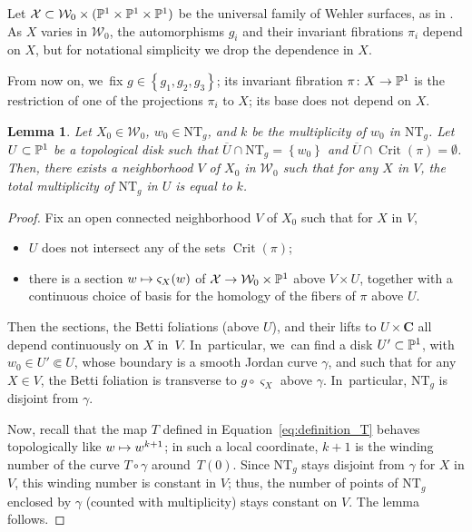 \documentclass[11pt]{article}
\newcommand\mto{\mathchoice{\longmapsto}{\mapsto}{\mapsto}{\mapsto}}
\newcommand{\set}[1]{\left\{#1\right\}}
\DeclareMathOperator{\Crit}{Crit}
\def\C{\mathbf{C}}
\newcommand{\cX}{\mathcal{X}}
\newcommand{\cW}{\mathcal{W}}
\newcommand{\NT}{{\mathrm{NT}}}
\theoremstyle{plain}
\newtheorem{lem}[thm]{Lemma}
\theoremstyle{definition}
\numberwithin{equation}{section}
\begin{document}
Let $\cX\subset \cW_0\times (\P^1\times \P^1\times \P^1)$ be
the universal family of Wehler surfaces, as in \cite[\S 2]{finite_orbits}.
As $X$ varies in $ \cW_0$, the automorphisms $g_i$ and their
invariant fibrations $\pi_i$ depend on $X$, but for notational simplicity we drop the dependence in $X$.

From now on, we~fix $g\in \set{g_1, g_2, g_3}$; its invariant fibration $\pi\colon X\to \P^1$ is the restriction of one of the projections $\pi_i$ to $X$; its base does not depend on $X$.

\begin{lem}\label{lem:NT_local}
Let $X_0\in \cW_0$, $w_0\in \NT_g$, and $k$ be the multiplicity of $w_0$ in $\NT_g$.
Let $U\subset \P^1$ be a topological disk such that $\overline U\cap \NT_g = \set{w_0}$ and $\overline U\cap \Crit(\pi)=\emptyset$.
Then, there exists a neighborhood $V$
of $X_0$ in $\cW_0$ such that for any $X$ in $V$, the total multiplicity of
$\NT_g$ in $U$ is equal to $k$.
\end{lem}

\begin{proof}
Fix an open connected neighborhood $V$ of $X_0$ such that for $X$ in $V$,
\begin{itemize}
\item $U$ does not intersect any of the sets $\Crit(\pi)$;
\item there is a section $w\mto \varsigma_X(w)$
of $\cX\to \cW_0\times \P^1$ above $V\times U$, together with a continuous choice of basis for the homology of the fibers of $\pi$ above $U$.
\end{itemize}
Then the sections, the Betti foliations (above $U$), and their lifts to $U\times \C$ all
depend continuously on $X$ in~$V$. In~particular, we~can find a disk $U'\subset \P^1$, with
$w_0\in U'\Subset U$, whose boundary is a
smooth Jordan curve $\gamma$, and such that
for any $X\in V$, the Betti foliation is transverse to $g\circ \varsigma_X$ above $\gamma$. In~particular,
$\NT_g$ is disjoint from $\gamma$.

Now, recall that the map $T$ defined in Equation~\eqref{eq:definition_T}
behaves topologically like $w\mto w^{k+1}$; in such a local coordinate,
$k+1$ is the winding number of the curve $T\circ \gamma$ around~$T(0)$.
Since $\NT_g$ stays disjoint from $\gamma$ for $X$ in $V$,
this winding number is constant in $V$; thus, the number of points of $\NT_g$ enclosed by $\gamma$ (counted with multiplicity) stays constant on $V$. The
lemma follows.
\end{proof}
\end{document}
